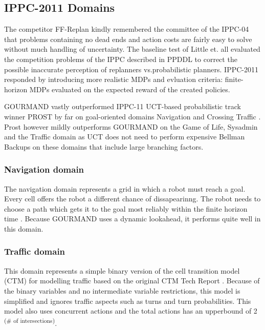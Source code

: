 \documentclass[runningheads,a4paper]{llncs}
\begin{document}
\subsection{IPPC-2011 Domains}
The competitor FF-Replan \cite{FFReplan} kindly remembered the committee of the IPPC-04 that problems containing no dead ends and action costs are fairly easy to solve without much handling of uncertainty. The baseline test of Little et. all evaluated the competition problems of the IPPC described in PPDDL to correct the possible inaccurate perception of replanners vs.\@ probabilistic planners. IPPC-2011 responded by introducing more realistic MDPs and evluation criteria: finite-horizon MDPs evaluated on the expected reward of the created policies.

GOURMAND vastly outperformed IPPC-11 UCT-based probabilistic track winner PROST by far on goal-oriented domains Navigation and Crossing Traffic \cite{kolobov2012gourmand}. Prost however mildly outperforms GOURMAND on the Game of Life, Sysadmin and the Traffic domain as UCT does not need to perform expensive Bellman Backups on these domains that include large branching factors. 

\subsubsection{Navigation domain}
The navigation domain represents a grid in which a robot must reach a goal. Every cell offers the robot a different chance of dissapearinng. The robot needs to choose a path which gets it to the goal most reliably within the finite horizon time \cite{sanner2011navigation}. Because GOURMAND uses a dynamic lookahead, it performs quite well in this domain.


\subsubsection{Traffic domain}
This domain represents a simple binary version of the cell transition model (CTM) for modelling traffic based on the original CTM Tech Report \cite{sanner2011traffic}. Because of the binary variables and no intermediate variable restrictions, this model is simplified and ignores traffic aspects such as turns and turn probabilities. This model also uses concurrent actions and the total actions has an upperbound of 2\textsuperscript{ (\# of intersections)}.

\end{document}

